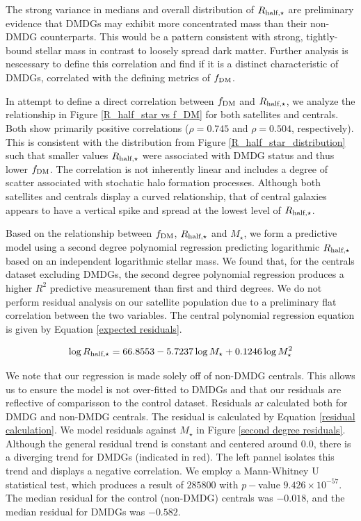 \documentclass[twocolumn]{openjournal}
\begin{document}
The strong variance in medians and overall distribution of $R_{\textup{half}, \star}$ are preliminary evidence that DMDGs may exhibit more concentrated mass than their non-DMDG counterparts. This would be a pattern consistent with strong, tightly-bound stellar mass in contrast to loosely spread dark matter. Further analysis is nescessary to define this correlation and find if it is a distinct characteristic of DMDGs, correlated with the defining metrics of $f_\textup{DM}$.

In attempt to define a direct correlation between $f_\textup{DM}$ and $R_{\textup{half}, \star}$, we analyze the relationship in Figure \ref{R_half_star vs f_DM} for both satellites and centrals. Both show primarily positive correlations ($\rho=0.745$ and $\rho = 0.504$, respectively). This is consistent with the distribution from Figure \ref{R_half_star_distribution} such that smaller values $R_{\textup{half}, \star}$  were associated with DMDG status and thus lower $f_\textup{DM}$. The correlation is not inherently linear and includes a degree of scatter associated with stochatic halo formation processes. Although both satellites and centrals display a curved relationship, that of central galaxies appears to have a vertical spike and spread at the lowest level of $R_{\textup{half}, \star}$. 

Based on the relationship between $f_\textup{DM}$, $R_{\textup{half}, \star}$ and $M_\star$, we form a predictive model using a second degree polynomial regression predicting logarithmic $R_{\textup{half}, \star}$ based on an independent logarithmic stellar mass. We found that, for the centrals dataset excluding DMDGs, the second degree polynomial regression produces a higher $R^2$ predictive measurement than first and third degrees. We do not perform residual analysis on our satellite population due to a preliminary flat correlation between the two variables. The central polynomial regression equation is given by Equation \ref{expected residuals}.

\begin{equation}
\label{expected residuals}
\log R_{\textup{half,} \star} = 66.8553 -5.7237 \log M_\star +0.1246 \log M_\star^2
\end{equation}

We note that our regression is made solely off of non-DMDG centrals. This allows us to ensure the model is not over-fitted to DMDGs and that our residuals are reflective of comparisson to the control dataset. Residuals ar calculated both for DMDG and non-DMDG centrals. The residual is calculated by Equation \ref{residual calculation}. We model residuals against $M_\star$ in Figure \ref{second degree residuals}. Although the general residual trend is constant and centered around $0.0$, there is a diverging trend for DMDGs (indicated in red). The left pannel isolates this trend and displays a negative correlation. We employ a Mann-Whitney U statistical test, which produces a result of $285800$ with $p-$value $9.426 \times 10^{-57}$. The median residual for the control (non-DMDG) centrals was $-0.018$, and the median residual for DMDGs was $-0.582$. 
\end{document}
